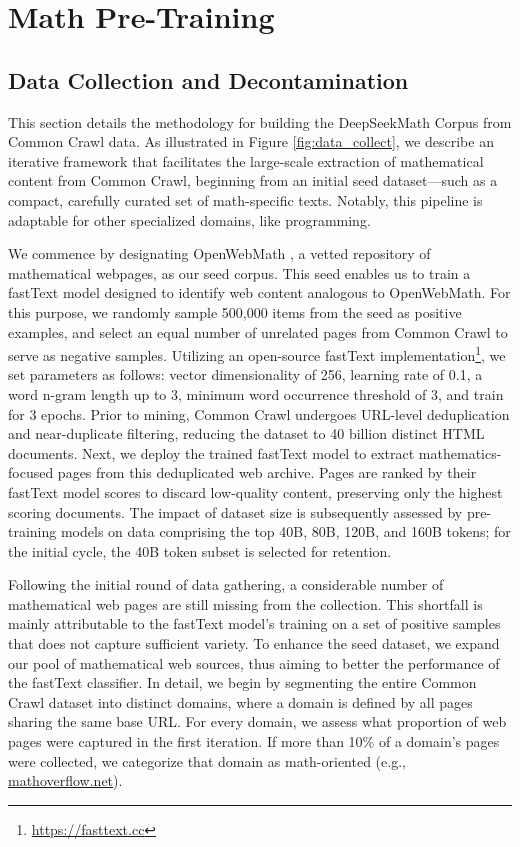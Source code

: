 \section{Math Pre-Training}

\subsection{Data Collection and Decontamination} This section details the methodology for building the DeepSeekMath Corpus from Common Crawl data. As illustrated in Figure \ref{fig:data_collect}, we describe an iterative framework that facilitates the large-scale extraction of mathematical content from Common Crawl, beginning from an initial seed dataset—such as a compact, carefully curated set of math-specific texts. Notably, this pipeline is adaptable for other specialized domains, like programming.

We commence by designating OpenWebMath \citep{openwebmath}, a vetted repository of mathematical webpages, as our seed corpus. This seed enables us to train a fastText model \citep{joulin2016fasttext} designed to identify web content analogous to OpenWebMath. For this purpose, we randomly sample 500,000 items from the seed as positive examples, and select an equal number of unrelated pages from Common Crawl to serve as negative samples. Utilizing an open-source fastText implementation\footnote{\url{https://fasttext.cc}}, we set parameters as follows: vector dimensionality of 256, learning rate of 0.1, a word n-gram length up to 3, minimum word occurrence threshold of 3, and train for 3 epochs. Prior to mining, Common Crawl undergoes URL-level deduplication and near-duplicate filtering, reducing the dataset to 40 billion distinct HTML documents. Next, we deploy the trained fastText model to extract mathematics-focused pages from this deduplicated web archive. Pages are ranked by their fastText model scores to discard low-quality content, preserving only the highest scoring documents. The impact of dataset size is subsequently assessed by pre-training models on data comprising the top 40B, 80B, 120B, and 160B tokens; for the initial cycle, the 40B token subset is selected for retention.

Following the initial round of data gathering, a considerable number of mathematical web pages are still missing from the collection. This shortfall is mainly attributable to the fastText model’s training on a set of positive samples that does not capture sufficient variety. To enhance the seed dataset, we expand our pool of mathematical web sources, thus aiming to better the performance of the fastText classifier. In detail, we begin by segmenting the entire Common Crawl dataset into distinct domains, where a domain is defined by all pages sharing the same base URL. For every domain, we assess what proportion of web pages were captured in the first iteration. If more than 10\% of a domain’s pages were collected, we categorize that domain as math-oriented (e.g., \url{mathoverflow.net}). 

